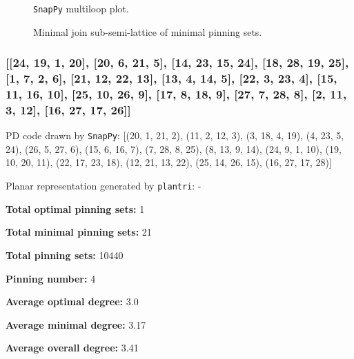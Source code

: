 \documentclass{article}%
\begin{document}
\begin{multicols}{2}
\begin{figure}[H]
\centering

\caption{\texttt{SnapPy} multiloop plot.}
\label{fig:tex/img/[[10, 5, 1, 6], [6, 11, 7, 28], [19, 9, 20, 10], [4, 14, 5, 15], [1, 23, 2, 24], [11, 24, 12, 25], [7, 17, 8, 18], [18, 27, 19, 28], [8, 26, 9, 27], [20, 16, 21, 15], [21, 3, 22, 4], [22, 13, 23, 14],.svg}
\end{figure}
\columnbreak

\begin{figure}[H]
\centering
\scalebox{0.8}{}
\caption{Minimal join sub-semi-lattice of minimal pinning sets.}
\label{fig:tex/img/[[10, 5, 1, 6], [6, 11, 7, 28], [19, 9, 20, 10], [4, 14, 5, 15], [1, 23, 2, 24], [11, 24, 12, 25], [7, 17, 8, 18], [18, 27, 19, 28], [8, 26, 9, 27], [20, 16, 21, 15], [21, 3, 22, 4], [22, 13, 23, 14],.pgf}
\end{figure}
\end{multicols}

\newpage

\subsubsection{[[24, 19, 1, 20], [20, 6, 21, 5], [14, 23, 15, 24], [18, 28, 19, 25], [1, 7, 2, 6], [21, 12, 22, 13], [13, 4, 14, 5], [22, 3, 23, 4], [15, 11, 16, 10], [25, 10, 26, 9], [17, 8, 18, 9], [27, 7, 28, 8], [2, 11, 3, 12], [16, 27, 17, 26]]}

{\small\noindent PD code drawn by \texttt{SnapPy}: [(20, 1, 21, 2), (11, 2, 12, 3), (3, 18, 4, 19), (4, 23, 5, 24), (26, 5, 27, 6), (15, 6, 16, 7), (7, 28, 8, 25), (8, 13, 9, 14), (24, 9, 1, 10), (19, 10, 20, 11), (22, 17, 23, 18), (12, 21, 13, 22), (25, 14, 26, 15), (16, 27, 17, 28)]}

{\small\noindent Planar representation generated by \texttt{plantri}: -}

\begin{multicols}{2}
{\normalsize \noindent\textbf{Total optimal pinning sets:} 1

\noindent\textbf{Total minimal pinning sets:} 21

\noindent\textbf{Total pinning sets:} 10440

\noindent\textbf{Pinning number:} 4

}
\columnbreak

{\normalsize \noindent\textbf{Average optimal degree:} 3.0

\noindent\textbf{Average minimal degree:} 3.17

\noindent\textbf{Average overall degree:} 3.41

}
\end{multicols}
\end{document}
